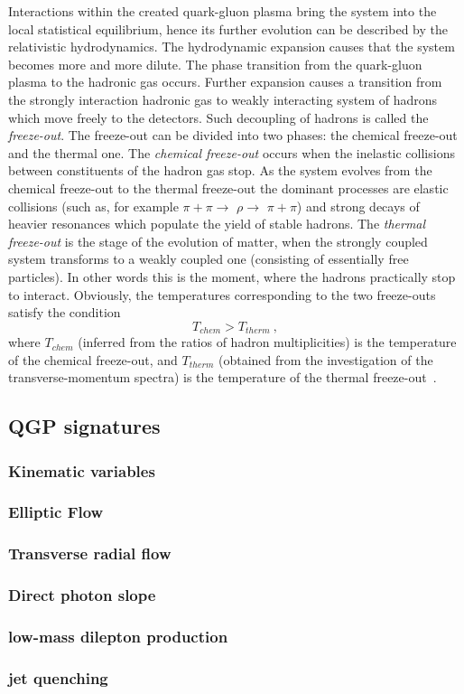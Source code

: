       Interactions within the created quark-gluon plasma bring the system into the local statistical equilibrium, hence its further evolution can be described by the relativistic hydrodynamics.
      The hydrodynamic expansion causes that the system becomes more and more dilute.
      The phase transition from the quark-gluon plasma to the hadronic gas occurs.
      Further expansion causes a transition from the strongly interaction hadronic gas to weakly interacting system of hadrons which move freely to the detectors.
      Such decoupling of hadrons is called the \textit{freeze-out}.
      The freeze-out can be divided into two phases: the chemical freeze-out and the thermal one.
      The \textit{chemical freeze-out} occurs when the inelastic collisions between constituents of the hadron gas stop.
      As the system evolves from the chemical freeze-out to the thermal freeze-out the dominant processes are elastic collisions (such as, for example $\pi+\pi\to$ $\rho \to$ $\pi+\pi$) and strong decays of heavier resonances which populate the yield of stable hadrons.
      The \textit{thermal freeze-out} is the stage of the evolution of matter, when the strongly coupled system transforms to a weakly coupled one (consisting of essentially free particles).
      In other words this is the moment, where the hadrons practically stop to interact.
      Obviously, the temperatures corresponding to the two freeze-outs satisfy the condition
      \begin{equation}
        T_{chem} > T_{therm}~,
      \end{equation}
      where $T_{chem}$ (inferred from the ratios of hadron multiplicities) is the temperature of the chemical freeze-out, and $T_{therm}$ (obtained from the investigation of the transverse-momentum spectra) is the temperature of the thermal freeze-out~\cite{florkowski}.

    \subsection{QGP signatures}

      \subsubsection{Kinematic variables} %
      \subsubsection{Elliptic Flow}
      \subsubsection{Transverse radial flow}
      \subsubsection{Direct photon slope}
      \subsubsection{low-mass dilepton production}
      \subsubsection{jet quenching}


